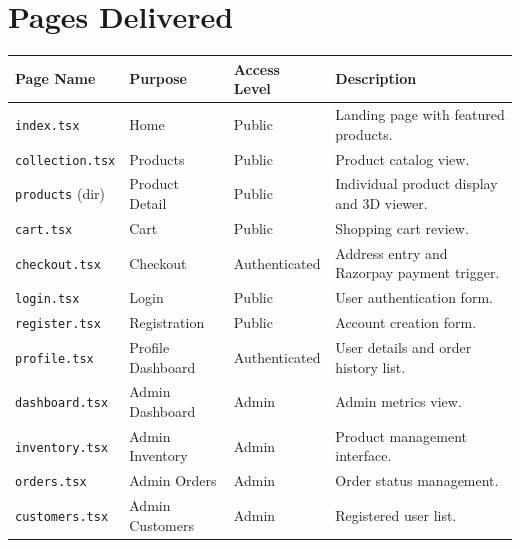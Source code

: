 \documentclass[11pt,a4paper]{article}
\begin{document}
\section{Pages Delivered}
\begin{longtable}{@{}p{3.2cm}p{3.2cm}p{2.6cm}p{5.5cm}@{}}
    \toprule
    \textbf{Page Name} & \textbf{Purpose} & \textbf{Access Level} & \textbf{Description} \\
    \midrule
    \endhead
    \texttt{index.tsx}      & Home              & Public        & Landing page with featured products. \\
    \texttt{collection.tsx} & Products          & Public        & Product catalog view. \\
    \texttt{products} (dir) & Product Detail    & Public        & Individual product display and 3D viewer. \\
    \texttt{cart.tsx}       & Cart              & Public        & Shopping cart review. \\
    \texttt{checkout.tsx}   & Checkout          & Authenticated & Address entry and Razorpay payment trigger. \\
    \texttt{login.tsx}      & Login             & Public        & User authentication form. \\
    \texttt{register.tsx}   & Registration      & Public        & Account creation form. \\
    \texttt{profile.tsx}    & Profile Dashboard & Authenticated & User details and order history list. \\
    \texttt{dashboard.tsx}  & Admin Dashboard   & Admin         & Admin metrics view. \\
    \texttt{inventory.tsx}  & Admin Inventory   & Admin         & Product management interface. \\
    \texttt{orders.tsx}     & Admin Orders      & Admin         & Order status management. \\
    \texttt{customers.tsx}  & Admin Customers   & Admin         & Registered user list. \\
    \bottomrule
\end{longtable}

\end{document}
